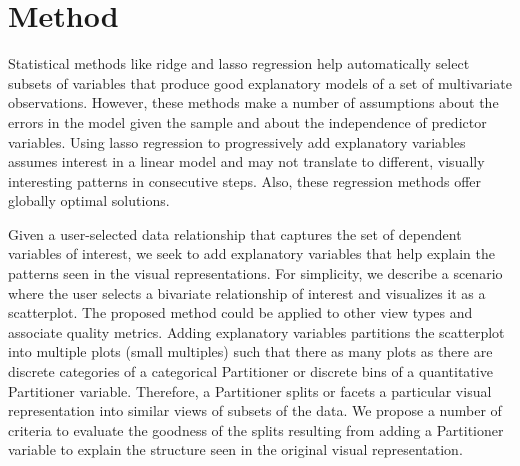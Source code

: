 \section{Method}
Statistical methods like ridge and lasso regression help automatically select subsets of variables that produce good explanatory models of a set of multivariate observations. However, these methods make a number of assumptions about the errors in the model given the sample and about the independence of predictor variables. Using lasso regression to progressively add explanatory variables assumes interest in a linear model and may not translate to different, visually interesting  patterns in consecutive steps. Also, these regression methods offer globally optimal solutions.

Given a user-selected data relationship that captures the set of dependent variables of interest, we seek to add explanatory variables that help explain the patterns seen in the visual representations. For simplicity, we describe a scenario where the user selects a bivariate relationship of interest and visualizes it as a scatterplot. The proposed method could be applied to other view types and associate quality metrics. Adding explanatory variables partitions the scatterplot into multiple plots (small multiples) such that there as many plots as there are discrete categories of a categorical Partitioner or discrete bins of a quantitative Partitioner variable. Therefore, a Partitioner splits or facets a particular visual representation into similar views of subsets of the data. We propose a number of criteria to evaluate the goodness of the splits resulting from adding a Partitioner variable to explain the structure seen in the original visual representation.

